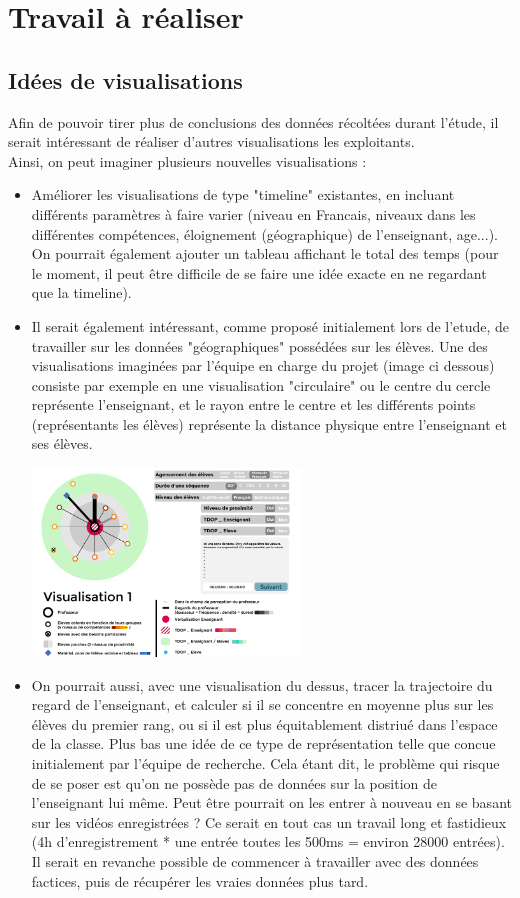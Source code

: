 \documentclass{article}
\begin{document}
\section{Travail à réaliser}
\subsection{Idées de visualisations}
Afin de pouvoir tirer plus de conclusions des données récoltées durant l'étude, il serait intéressant de réaliser d'autres visualisations les exploitants.\\
Ainsi, on peut imaginer plusieurs nouvelles visualisations :
\begin{itemize}
  \item Améliorer les visualisations de type "timeline" existantes, en incluant différents paramètres à faire varier (niveau en Francais, niveaux dans les différentes compétences, éloignement (géographique) de l'enseignant, age...). On pourrait également ajouter un tableau affichant le total des temps (pour le moment, il peut être difficile de se faire une idée exacte en ne regardant que la timeline).
  \item Il serait également intéressant, comme proposé initialement lors de l'etude, de travailler sur les données "géographiques" possédées sur les élèves. Une des visualisations imaginées par l'équipe en charge du projet (image ci dessous) consiste par exemple en une visualisation "circulaire" ou le centre du cercle représente l'enseignant, et le rayon entre le centre et les différents points (représentants les élèves) représente la distance physique entre l'enseignant et ses élèves.\\
    \begin{center}
      \includegraphics[height=5cm]{visu_cercle.png}
    \end{center}
  \item On pourrait aussi, avec une visualisation du dessus, tracer la trajectoire du regard de l'enseignant, et calculer si il se concentre en moyenne plus sur les élèves du premier rang, ou si il est plus équitablement distriué dans l'espace de la classe. Plus bas une idée de ce type de représentation telle que concue initialement par l'équipe de recherche. Cela étant dit, le problème qui risque de se poser est qu'on ne possède pas de données sur la position de l'enseignant lui même. Peut être pourrait on les entrer à nouveau en se basant sur les vidéos enregistrées ? Ce serait en tout cas un travail long et fastidieux (4h d'enregistrement * une entrée toutes les 500ms = environ 28000 entrées). Il serait en revanche possible de commencer à travailler avec des données factices, puis de récupérer les vraies données plus tard.\\

\end{itemize}
\end{document}
